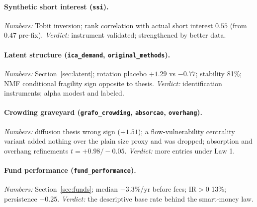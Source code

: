 \paragraph{Synthetic short interest (\texttt{ssi}).}
\emph{Numbers:} Tobit inversion; rank correlation with actual short
interest $0.55$ (from $0.47$ pre-fix). \emph{Verdict:} instrument
validated; strengthened by better data.

\paragraph{Latent structure (\texttt{ica\_demand},
\texttt{original\_methods}).}
\emph{Numbers:} Section~\ref{sec:latent}; rotation placebo
$+1.29$ vs $-0.77$; stability 81\%; NMF conditional fragility sign
opposite to thesis. \emph{Verdict:} identification instruments;
alpha modest and labeled.

\paragraph{Crowding graveyard (\texttt{grafo\_crowding},
\texttt{absorcao}, \texttt{overhang}).}
\emph{Numbers:} diffusion thesis wrong sign ($+1.51$); a
flow-vulnerability centrality variant added nothing over the plain
size proxy and was dropped; absorption and overhang refinements
$t=+0.98/-0.05$. \emph{Verdict:} more entries under Law 1.

\paragraph{Fund performance (\texttt{fund\_performance}).}
\emph{Numbers:} Section~\ref{sec:funds}; median $-3.3\%$/yr before
fees; IR$>0$ 13\%; persistence $+0.25$. \emph{Verdict:} the
descriptive base rate behind the smart-money law.
